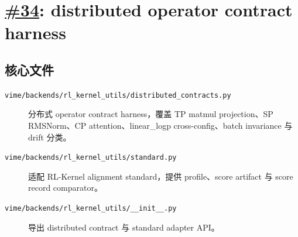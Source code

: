 \documentclass[11pt,a4paper]{ctexart}
\newcommand{\code}[1]{{\small\nolinkurl{#1}}}
\newcommand{\pr}[1]{\href{https://github.com/RL-Align/vime/pull/#1}{\##1}}
\newcommand{\fileitem}[2]{\item[\code{#1}] #2}
\begin{document}
\section{\pr{34}: distributed operator contract harness}

\subsection{核心文件}
\begin{description}
  \fileitem{vime/backends/rl_kernel_utils/distributed_contracts.py}{分布式 operator contract harness，覆盖 TP matmul projection、SP RMSNorm、CP attention、linear\_logp cross-config、batch invariance 与 drift 分类。}
  \fileitem{vime/backends/rl_kernel_utils/standard.py}{适配 RL-Kernel alignment standard，提供 profile、score artifact 与 score record comparator。}
  \fileitem{vime/backends/rl_kernel_utils/__init__.py}{导出 distributed contract 与 standard adapter API。}
\end{description}
\end{document}
